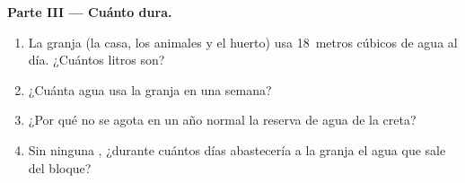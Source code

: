 \begin{problem}
\medskip
\noindent\textbf{Parte III --- Cuánto dura.}
\begin{enumerate}[resume]
  \item La granja (la casa, los animales y el huerto) usa 18~metros cúbicos
        de agua al día. ¿Cuántos litros son?
  \item ¿Cuánta agua usa la granja en una semana?
  \item ¿Por qué no se agota en un año normal la reserva de agua de la
        creta?
  \item Sin ninguna , ¿durante cuántos días abastecería a la granja el
        agua que sale del bloque?
\end{enumerate}
\end{problem}
